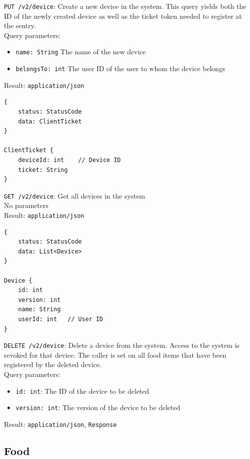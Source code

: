 \documentclass[12pt]{report}
\begin{document}
\texttt{PUT /v2/device}: Create a new device in the system. This query yields
both the ID of the newly created device as well as the ticket token needed to
register at the sentry.\\
Query parameters:
\begin{itemize}
\item \texttt{name: String} The name of the new device
\item \texttt{belongsTo: int} The user ID of the user to whom the device belongs
\end{itemize}
Result: \texttt{application/json}
\begin{lstlisting}
{
    status: StatusCode
    data: ClientTicket
}

ClientTicket {
    deviceId: int    // Device ID
    ticket: String
}
\end{lstlisting}\vspace{7mm}
\texttt{GET /v2/device}: Get all devices in the system\\
No parameters\\
Result: \texttt{application/json}
\begin{lstlisting}
{
    status: StatusCode
    data: List<Device>
}

Device {
    id: int
    version: int
    name: String
    userId: int   // User ID
}
\end{lstlisting}\vspace{7mm}
\texttt{DELETE /v2/device}: Delete a device from the system.
Access to the system is revoked for that device. The caller
is set on all food items that have been registered by the deleted
device.\\
Query parameters:
\begin{itemize}
\item \texttt{id: int}: The ID of the device to be deleted
\item \texttt{version: int}: The version of the device to be deleted
\end{itemize}
Result: \texttt{application/json}, \texttt{Response}

\subsection{Food}
\end{document}
